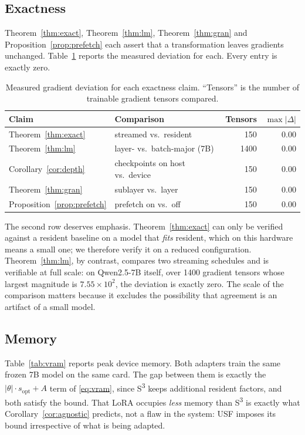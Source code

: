 \documentclass[preprint,12pt]{elsarticle}
\newcommand{\usf}{USF}
\newcommand{\sthree}{S\textsuperscript{3}}
\begin{document}
\subsection{Exactness}

Theorem~\ref{thm:exact}, Theorem~\ref{thm:lm}, Theorem~\ref{thm:gran} and Proposition~\ref{prop:prefetch} each assert that a
transformation leaves gradients unchanged. Table~\ref{tab:exact} reports the measured deviation for
each. Every entry is exactly zero.

\begin{table}[t]
\centering
\caption{Measured gradient deviation for each exactness claim. ``Tensors'' is the number of
trainable gradient tensors compared.}
\label{tab:exact}
\footnotesize
\begin{tabular}{@{}llrr@{}}
\toprule
\textbf{Claim} & \textbf{Comparison} & \textbf{Tensors} & $\max|\Delta|$ \\
\midrule
Theorem~\ref{thm:exact}     & streamed vs.\ resident        & 150  & $0.00$ \\
Theorem~\ref{thm:lm}        & layer- vs.\ batch-major (7B)  & 1400 & $0.00$ \\
Corollary~\ref{cor:depth}     & checkpoints on host vs.\ device & 150  & $0.00$ \\
Theorem~\ref{thm:gran}      & sublayer vs.\ layer           & 150  & $0.00$ \\
Proposition~\ref{prop:prefetch} & prefetch on vs.\ off          & 150  & $0.00$ \\
\bottomrule
\end{tabular}
\end{table}

The second row deserves emphasis. Theorem~\ref{thm:exact} can only be verified against a resident
baseline on a model that \emph{fits} resident, which on this hardware means a small one; we
therefore verify it on a reduced configuration. Theorem~\ref{thm:lm}, by contrast, compares two streaming
schedules and is verifiable at full scale: on Qwen2.5-7B itself, over 1400 gradient tensors whose
largest magnitude is $7.55\times 10^{2}$, the deviation is exactly zero. The scale of the
comparison matters because it excludes the possibility that agreement is an artifact of a small
model.

\subsection{Memory}

Table~\ref{tab:vram} reports peak device memory. Both adapters train the same frozen 7B model on the
same card. The gap between them is exactly the $|\theta|\cdot s_{\text{opt}} + A$ term of
\eqref{eq:vram}, since \sthree{} keeps additional resident factors, and both satisfy the bound. That
LoRA occupies \emph{less} memory than \sthree{} is exactly what Corollary~\ref{cor:agnostic} predicts, not a
flaw in the system: \usf{} imposes its bound irrespective of what is being adapted.
\end{document}
